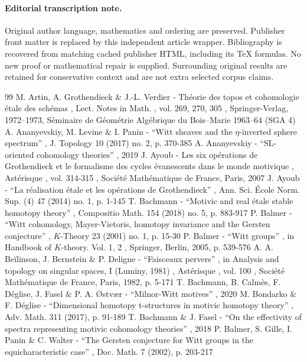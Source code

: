 \documentclass[11pt]{article}
\numberwithin{equation}{section}\renewcommand{\encodingdefault}{TU}
\begin{document}
\paragraph{Editorial transcription note.}
Original author language, mathematics and ordering are preserved. Publisher front matter is replaced by this independent article wrapper. Bibliography is recovered from matching cached publisher HTML, including its TeX formulas. No new proof or mathematical repair is supplied. Surrounding original results are retained for conservative context and are not extra selected corpus claims.
\clearpage

\begin{thebibliography}{99}
 M. Artin, A. Grothendieck \& J.-L. Verdier - Théorie des topos et cohomologie étale des schémas , Lect. Notes in Math. , vol. 269, 270, 305 , Springer-Verlag, 1972–1973, Séminaire de Géométrie Algébrique du Bois–Marie 1963–64 (SGA 4)
 A. Ananyevskiy, M. Levine \& I. Panin - “Witt sheaves and the $\eta $-inverted sphere spectrum” , J. Topology 10 (2017) no. 2, p. 370-385
 A. Ananyevskiy - “$\mathrm{SL}$-oriented cohomology theories” , 2019
 J. Ayoub - Les six opérations de Grothendieck et le formalisme des cycles évanescents dans le monde motivique , Astérisque , vol. 314-315 , Société Mathématique de France, Paris, 2007
 J. Ayoub - “La réalisation étale et les opérations de Grothendieck” , Ann. Sci. École Norm. Sup. (4) 47 (2014) no. 1, p. 1-145
 T. Bachmann - “Motivic and real étale stable homotopy theory” , Compositio Math. 154 (2018) no. 5, p. 883-917
 P. Balmer - “Witt cohomology, Mayer-Vietoris, homotopy invariance and the Gersten conjecture” , $K$-Theory 23 (2001) no. 1, p. 15-30
 P. Balmer - “Witt groups” , in Handbook of $K$-theory. Vol. 1, 2 , Springer, Berlin, 2005, p. 539-576
 A. A. Beĭlinson, J. Bernstein \& P. Deligne - “Faisceaux pervers” , in Analysis and topology on singular spaces, I (Luminy, 1981) , Astérisque , vol. 100 , Société Mathématique de France, Paris, 1982, p. 5-171
 T. Bachmann, B. Calmès, F. Déglise, J. Fasel \& P. A. Østvær - “Milnor-Witt motives” , 2020
 M. Bondarko \& F. Déglise - “Dimensional homotopy t-structures in motivic homotopy theory” , Adv. Math. 311 (2017), p. 91-189
 T. Bachmann \& J. Fasel - “On the effectivity of spectra representing motivic cohomology theories” , 2018
 P. Balmer, S. Gille, I. Panin \& C. Walter - “The Gersten conjecture for Witt groups in the equicharacteristic case” , Doc. Math. 7 (2002), p. 203-217

\end{thebibliography}
\end{document}
